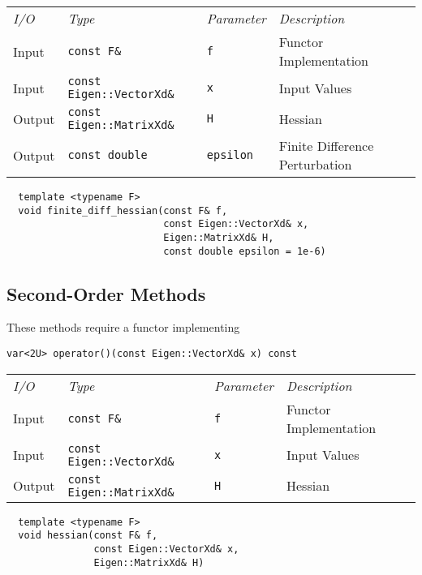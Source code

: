 \begin{tcolorbox}[colback=white,colframe=gray90, coltitle=black,boxrule=3pt,
fonttitle=\bfseries,title=Finite Difference Hessian]

\begin{tabular}{llll}
\textit{I/O} & \textit{Type} & \textit{Parameter} & \textit{Description} \\
Input & \texttt{const F\&} & \texttt{f} & Functor Implementation \\
Input & \texttt{const Eigen::VectorXd\&} & \texttt{x} & Input Values \\
Output & \texttt{const Eigen::MatrixXd\&} & \texttt{H} & Hessian \\
Output & \texttt{const double} & \texttt{epsilon} & Finite Difference Perturbation
\end{tabular}

\vspace{5mm}

\begin{verbatim}
  template <typename F>
  void finite_diff_hessian(const F& f,
                           const Eigen::VectorXd& x,
                           Eigen::MatrixXd& H,
                           const double epsilon = 1e-6)
\end{verbatim}

\end{tcolorbox}

\subsection{Second-Order Methods}

These methods require a functor implementing
%
\begin{verbatim}
var<2U> operator()(const Eigen::VectorXd& x) const
\end{verbatim}

\begin{tcolorbox}[colback=white,colframe=gray90, coltitle=black,boxrule=3pt,
fonttitle=\bfseries,title=Hessian]

\begin{tabular}{llll}
\textit{I/O} & \textit{Type} & \textit{Parameter} & \textit{Description} \\
Input & \texttt{const F\&} & \texttt{f} & Functor Implementation \\
Input & \texttt{const Eigen::VectorXd\&} & \texttt{x} & Input Values \\
Output & \texttt{const Eigen::MatrixXd\&} & \texttt{H} & Hessian
\end{tabular}

\vspace{5mm}

\begin{verbatim}
  template <typename F>
  void hessian(const F& f,
               const Eigen::VectorXd& x,
               Eigen::MatrixXd& H)
\end{verbatim}

\end{tcolorbox}

